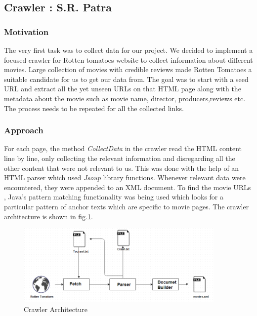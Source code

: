 \subsection{Crawler : S.R. Patra}
\subsubsection{Motivation}
The very first task was to collect data for our project. We decided to implement a focused crawler for Rotten tomatoes website to collect information about different movies. Large collection of movies with credible reviews made Rotten Tomatoes a suitable candidate for us to get our data from. The goal was to start with a seed URL and extract all the yet unseen URLs on that HTML page along with the metadata about the movie such as movie name, director, producers,reviews etc. The process needs to be repeated for all the collected links.
\subsubsection{Approach}
For each page, the method \textit{CollectData} in the crawler read the HTML content line by line, only collecting the relevant information and disregarding all the other content that were not relevant to us. This was done with the help of an HTML parser which used \textit{Jsoup} library functions. Whenever relevant data were encountered, they were appended to an XML document. To find the movie URLs , Java's pattern matching functionality was being used which looks for a particular pattern of anchor texts which are specific to movie pages. The crawler architecture is shown in fig.\ref{fig:architecture}.

\begin{figure}[H]
    \centering
    \includegraphics[width=4.0in]{crawler_arch.png}
    \caption{Crawler Architecture}
    \label{fig:architecture}
\end{figure}

